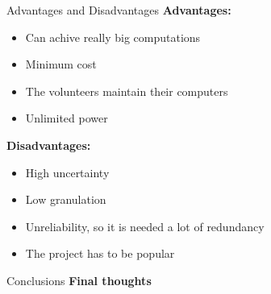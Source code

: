 \documentclass{beamer}
\begin{document}
\begin{frame}{Advantages and Disadvantages}
\textbf{Advantages:}
\begin{itemize}
\item Can achive really big computations
\item Minimum cost 
\item The volunteers maintain their computers
\item Unlimited power
\end{itemize}
\textbf{Disadvantages:}
\begin{itemize}
\item High uncertainty
\item Low granulation
\item Unreliability, so it is needed a lot of redundancy
\item The project has to be popular
\end{itemize}
\end{frame}
\begin{frame}{Conclusions}
\huge \textbf{Final thoughts}
\end{frame}
\end{document}
